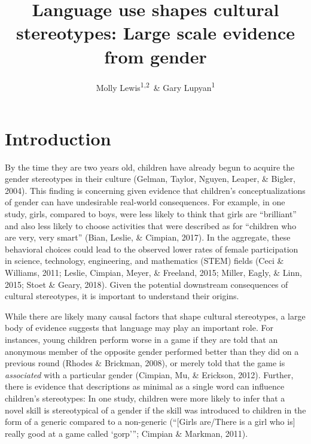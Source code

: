 \documentclass[man,floatsintext]{apa6}
\title{Language use shapes cultural stereotypes: Large scale evidence from
gender}
\author{Molly Lewis\textsuperscript{1,2}~\& Gary Lupyan\textsuperscript{1}}
\date{}
\affiliation{
\vspace{0.5cm}
\textsuperscript{1} University of Wisconsin-Madison\\\textsuperscript{2} University of Chicago}
\theoremstyle{definition}
\theoremstyle{definition}
\theoremstyle{definition}
\theoremstyle{remark}
\begin{document}
\maketitle

\section{Introduction}\label{introduction}

By the time they are two years old, children have already begun to
acquire the gender stereotypes in their culture (Gelman, Taylor, Nguyen,
Leaper, \& Bigler, 2004). This finding is concerning given evidence that
children's conceptualizations of gender can have undesirable real-world
consequences. For example, in one study, girls, compared to boys, were
less likely to think that girls are \enquote{brilliant} and also less
likely to choose activities that were described as for \enquote{children
who are very, very smart} (Bian, Leslie, \& Cimpian, 2017). In the
aggregate, these behavioral choices could lead to the observed lower
rates of female participation in science, technology, engineering, and
mathematics (STEM) fields (Ceci \& Williams, 2011; Leslie, Cimpian,
Meyer, \& Freeland, 2015; Miller, Eagly, \& Linn, 2015; Stoet \& Geary,
2018). Given the potential downstream consequences of cultural
stereotypes, it is important to understand their origins.

While there are likely many causal factors that shape cultural
stereotypes, a large body of evidence suggests that language may play an
important role. For instances, young children perform worse in a game if
they are told that an anonymous member of the opposite gender performed
better than they did on a previous round (Rhodes \& Brickman, 2008), or
merely told that the game is \emph{associated} with a particular gender
(Cimpian, Mu, \& Erickson, 2012). Further, there is evidence that
descriptions as minimal as a single word can influence children's
stereotypes: In one study, children were more likely to infer that a
novel skill is stereotypical of a gender if the skill was introduced to
children in the form of a generic compared to a non-generic (``{[}Girls
are/There is a girl who is{]} really good at a game called `gorp''';
Cimpian \& Markman, 2011).
\end{document}

